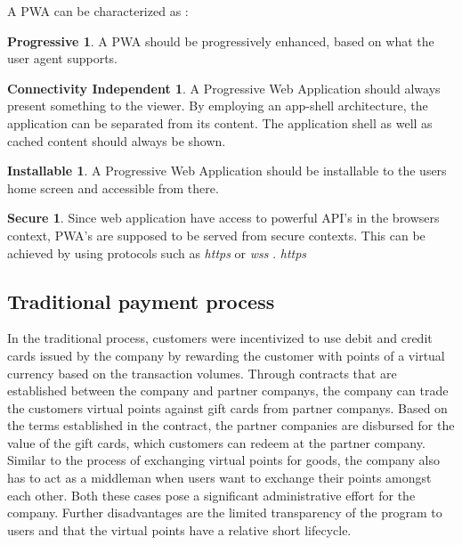 A PWA can be characterized as \cite{pwas}:

\theoremstyle{definition}
\newtheorem*{theorem-progressive}{Progressive}
\newtheorem*{theorem}{Connectivity Independent}
\newtheorem*{theorem-install}{Installable}
\newtheorem*{theorem-secure}{Secure}

\begin{theorem-progressive}
A PWA should be progressively enhanced, based on what the user agent supports.
\end{theorem-progressive}

\begin{theorem}
A Progressive Web Application should always present something to the viewer. By employing an app-shell architecture, the application can be separated from its content. The application shell as well as cached content should always be shown.
\end{theorem}
\begin{theorem-install}
A Progressive Web Application should be installable to the users home screen and accessible from there.

\end{theorem-install}
\begin{theorem-secure}
Since web application have access to powerful API's in the browsers context, PWA's are supposed to be served from secure contexts. This can be achieved by using protocols such as \textit{https} or \textit{wss} \cite{securitychrome}. \textit{https}

\end{theorem-secure}
\subsection{Traditional payment process}
In the traditional process, customers were incentivized to use debit and credit cards issued by the company by rewarding the customer with points of a virtual currency based on the transaction volumes.
Through contracts that are established between the company and partner companys, the company can trade the customers virtual points against gift cards from partner companys.
Based on the terms established in the contract, the partner companies are disbursed for the value of the gift cards, which customers can redeem at the partner company.
Similar to the process of exchanging virtual points for goods, the company also has to act as a middleman when users want to exchange their points amongst each other. Both these cases pose a significant administrative effort for the company. Further disadvantages are the limited transparency of the program to users and that the virtual points have a relative short lifecycle.

